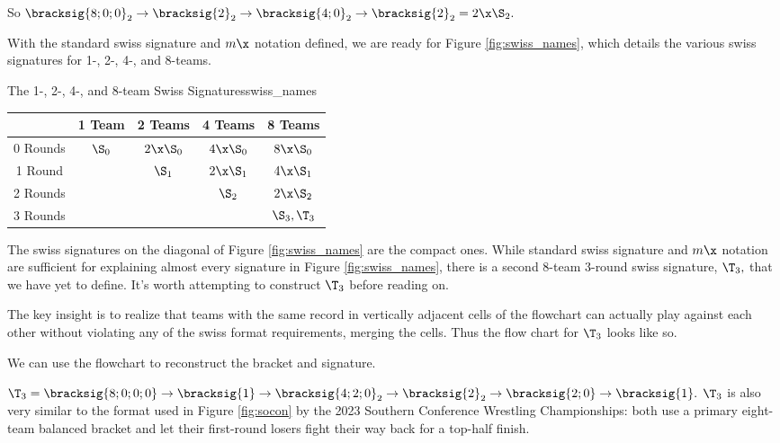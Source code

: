 {    So $\bracksig{8;0;0}_2 \to \bracksig{2}_2 \to \bracksig{4;0}_2 \to \bracksig{2}_2 = 2\x\S_2.$

    With the standard swiss signature and $m\x$ notation defined, we are ready for Figure \ref{fig:swiss_names}, which details the various swiss signatures for 1-, 2-, 4-, and 8-teams.

    \begin{figg}{The 1-, 2-, 4-, and 8-team Swiss Signatures}{swiss_names}
        \begin{center}
            \begin{tabular}{ c | c | c | c | c}
                & 1 Team & 2 Teams & 4 Teams & 8 Teams\\
                \hline
                0 Rounds & $\S_0$ & $2\x\S_0$ & $4\x\S_0$ & $8\x\S_0$\\
                \hline
                1 Round & & $\S_1$ & $2\x\S_1$ & $4\x\S_1$\\
                \hline
                2 Rounds & & & $\S_2$ & $2\x\S_2$\\
                \hline
                \multirow{1}{*}{3 Rounds} & & & &  $\S_3, \T_3$ \\
            \end{tabular}
        \end{center}
        \end{figg}

    The swiss signatures on the diagonal of Figure \ref{fig:swiss_names} are the compact ones. While standard swiss signature and $m\x$ notation are sufficient for explaining almost every signature in Figure \ref{fig:swiss_names}, there is a second 8-team 3-round swiss signature, $\T_3,$ that we have yet to define. It's worth attempting to construct $\T_3$ before reading on.

    The key insight is to realize that teams with the same record in vertically adjacent cells of the flowchart can actually play against each other without violating any of the swiss format requirements, merging the cells. Thus the flow chart for $\T_3$ looks like so.


    We can use the flowchart to reconstruct the bracket and signature.


    $\T_3 = \bracksig{8;0;0;0} \to \bracksig{1} \to \bracksig{4;2;0}_2 \to \bracksig{2}_2 \to \bracksig{2;0} \to \bracksig{1}.$ $\T_3$ is also very similar to the format used in Figure \ref{fig:socon} by the 2023 Southern Conference Wrestling Championships: both use a primary eight-team balanced bracket and let their first-round losers fight their way back for a top-half finish.

}
